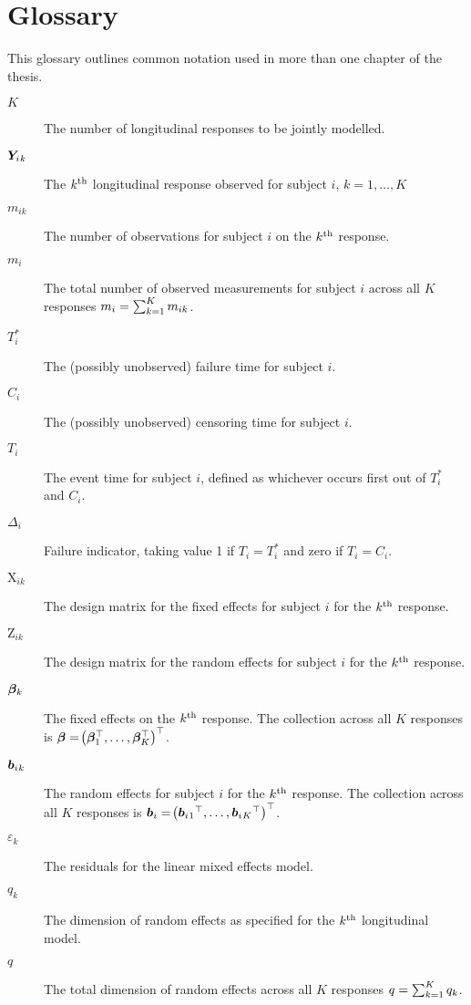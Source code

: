 \chapter*{Glossary}
\begin{small}
\begin{multicols}{2}
This glossary outlines common notation used in more than one chapter of the thesis.
\begin{description}
    \item[$K$] The number of longitudinal responses to be jointly modelled.
    \item[$\bm{Y}_i{_k}$] The $k^{\text{th}}$ longitudinal response observed for subject $i$, $k=1,\ldots,K$
    \item[$m_{ik}$] The number of observations for subject $i$ on the $k^{\text{th}}$ response.
    \item[$m_i$] The total number of observed measurements for subject $i$ across all $K$ responses \ie $m_i=\sum_{k=1}^K m_{ik}$.
    \item[$T_i^*$] The (possibly unobserved) failure time for subject $i$.
    \item[$C_i$] The (possibly unobserved) censoring time for subject $i$.
    \item[$T_i$] The event time for subject $i$, defined as whichever occurs first out of $T_i^*$ and $C_i$.
    \item[$\Delta_i$] Failure indicator, taking value 1 if $T_i=T_i^*$ and zero if $T_i=C_i$.
    \item[$\mathrm{X}_{ik}$] The design matrix for the fixed effects for subject $i$ for the $k^{\text{th}}$ response.
    \item[$\mathrm{Z}_{ik}$] The design matrix for the random effects for subject $i$ for the $k^{\text{th}}$ response.
    \item[$\bm{\beta}_k$] The fixed effects on the $k^{\text{th}}$ response. The collection across all $K$ responses is $\bm{\beta}=\!\left(\bm{\beta}_1^\top,\ldots,\bm{\beta}_K^\top\right)^\top$.
    \item[$\bm{b}_i{_k}$] The random effects for subject $i$ for the $k^{\text{th}}$ response. The collection across all $K$ responses is $\bm{b}_i=\!\left(\bm{b}_i{_1}^\top,\ldots,\bm{b}_i{_K}^\top\right)^\top$.
    \item[$\varepsilon_k$] The residuals for the linear mixed effects model.
    \item[$q_k$] The dimension of random effects as specified for the $k^{\text{th}}$ longitudinal model.
    \item[$q$] The total dimension of random effects across all $K$ responses \ie $q=\sum_{k=1}^K q_k$.

\end{description}
\end{multicols}
\end{small}
